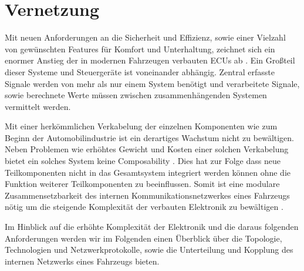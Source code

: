 \section{Vernetzung}
Mit neuen Anforderungen an die Sicherheit und Effizienz, sowie einer Vielzahl von gewünschten Features 
für Komfort und Unterhaltung, zeichnet sich ein enormer Anstieg der in modernen Fahrzeugen verbauten ECUs ab \cite{GatewayIEEE}.
Ein Großteil dieser Systeme und Steuergeräte ist voneinander abhängig. Zentral erfasste Signale werden von mehr als nur einem
System benötigt und verarbeitete Signale, sowie berechnete Werte müssen zwischen zusammenhängenden Systemen vermittelt werden.

Mit einer herkömmlichen Verkabelung der einzelnen Komponenten wie zum Beginn der Automobilindustrie ist ein derartiges Wachstum
nicht zu bewältigen. Neben Problemen wie erhöhtes Gewicht und Kosten einer solchen Verkabelung bietet ein solches System keine
Composability \cite{Bosch}. Dies hat zur Folge dass neue Teilkomponenten nicht in das Gesamtsystem integriert werden können ohne die Funktion 
weiterer Teilkomponenten zu beeinflussen. Somit ist eine modulare Zusammensetzbarkeit des internen Kommunikationsnetzwerkes eines Fahrzeugs nötig um die 
steigende Komplexität der verbauten Elektronik zu bewältigen \cite{Bosch}.

Im Hinblick auf die erhöhte Komplexität der Elektronik und die daraus folgenden Anforderungen werden wir im Folgenden
einen Überblick über die Topologie, Technologien und Netzwerkprotokolle, sowie die Unterteilung und Kopplung des internen Netzwerks eines Fahrzeugs bieten.


